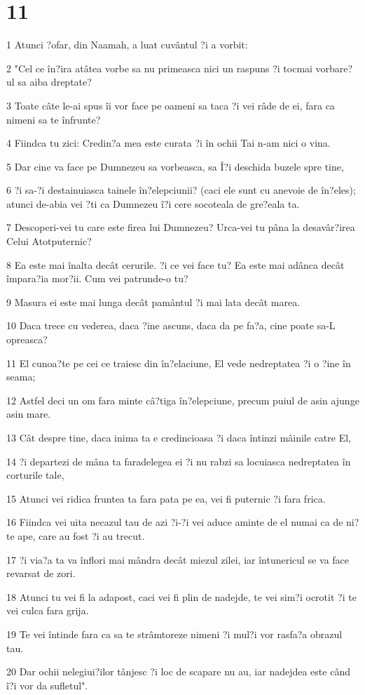 \chapter{11}

\par 1 Atunci ?ofar, din Naamah, a luat cuvântul ?i a vorbit:
\par 2 "Cel ce în?ira atâtea vorbe sa nu primeasca nici un raspuns ?i tocmai vorbare?ul sa aiba dreptate?
\par 3 Toate câte le-ai spus îi vor face pe oameni sa taca ?i vei râde de ei, fara ca nimeni sa te înfrunte?
\par 4 Fiindca tu zici: Credin?a mea este curata ?i în ochii Tai n-am nici o vina.
\par 5 Dar cine va face pe Dumnezeu sa vorbeasca, sa Î?i deschida buzele spre tine,
\par 6 ?i sa-?i destainuiasca tainele în?elepciunii? (caci ele sunt cu anevoie de în?eles); atunci de-abia vei ?ti ca Dumnezeu î?i cere socoteala de gre?eala ta.
\par 7 Descoperi-vei tu care este firea lui Dumnezeu? Urca-vei tu pâna la desavâr?irea Celui Atotputernic?
\par 8 Ea este mai înalta decât cerurile. ?i ce vei face tu? Ea este mai adânca decât împara?ia mor?ii. Cum vei patrunde-o tu?
\par 9 Masura ei este mai lunga decât pamântul ?i mai lata decât marea.
\par 10 Daca trece cu vederea, daca ?ine ascuns, daca da pe fa?a, cine poate sa-L opreasca?
\par 11 El cunoa?te pe cei ce traiesc din în?elaciune, El vede nedreptatea ?i o ?ine în seama;
\par 12 Astfel deci un om fara minte câ?tiga în?elepciune, precum puiul de asin ajunge asin mare.
\par 13 Cât despre tine, daca inima ta e credincioasa ?i daca întinzi mâinile catre El,
\par 14 ?i departezi de mâna ta faradelegea ei ?i nu rabzi sa locuiasca nedreptatea în corturile tale,
\par 15 Atunci vei ridica fruntea ta fara pata pe ea, vei fi puternic ?i fara frica.
\par 16 Fiindca vei uita necazul tau de azi ?i-?i vei aduce aminte de el numai ca de ni?te ape, care au fost ?i au trecut.
\par 17 ?i via?a ta va înflori mai mândra decât miezul zilei, iar întunericul se va face revarsat de zori.
\par 18 Atunci tu vei fi la adapost, caci vei fi plin de nadejde, te vei sim?i ocrotit ?i te vei culca fara grija.
\par 19 Te vei întinde fara ca sa te strâmtoreze nimeni ?i mul?i vor rasfa?a obrazul tau.
\par 20 Dar ochii nelegiui?ilor tânjesc ?i loc de scapare nu au, iar nadejdea este când î?i vor da sufletul".

